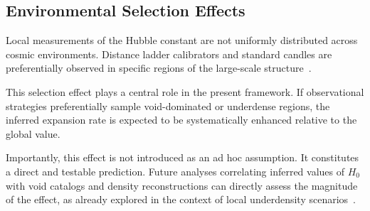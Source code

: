 \subsection{Environmental Selection Effects}
  \label{subsec:selection_effects}

  Local measurements of the Hubble constant are not uniformly distributed across cosmic environments.
  Distance ladder calibrators and standard candles are preferentially observed
  in specific regions of the large-scale structure~\cite{Riess2022SH0ES}.

  This selection effect plays a central role in the present framework.
  If observational strategies preferentially sample void-dominated or underdense regions,
  the inferred expansion rate is expected to be systematically enhanced relative to the global value.

  Importantly, this effect is not introduced as an ad hoc assumption.
  It constitutes a direct and testable prediction.
  Future analyses correlating inferred values of $H_0$ with void catalogs and density
  reconstructions can directly assess the magnitude of the effect, as already
  explored in the context of local underdensity scenarios~\cite{Shanks2019Void,Kennworthy2019VoidCritique}.
